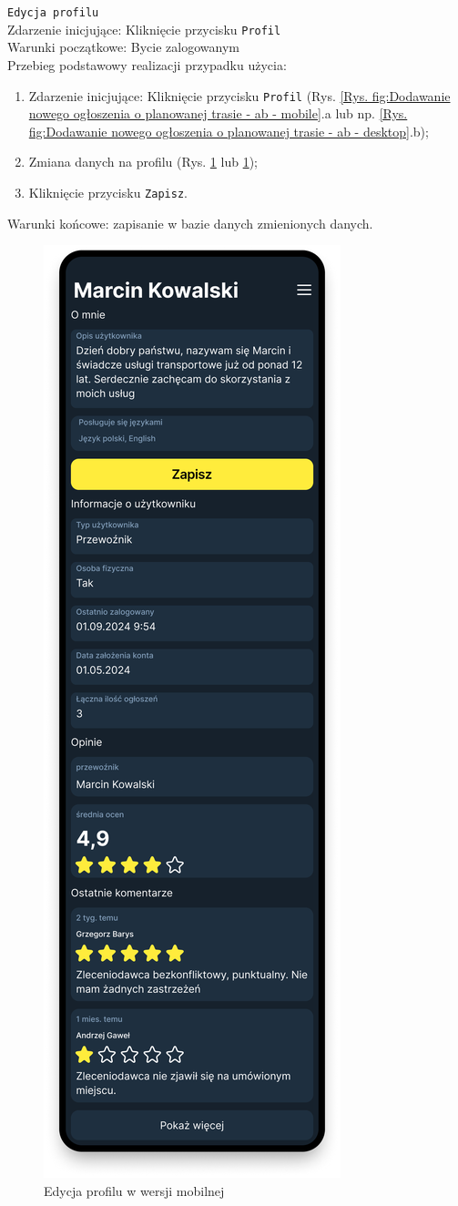 \texttt{Edycja profilu} \\
Zdarzenie inicjujące: Kliknięcie przycisku \texttt{Profil} \\
Warunki początkowe: Bycie zalogowanym \\
Przebieg podstawowy realizacji przypadku użycia: \\
\begin{enumerate}
    \item Zdarzenie inicjujące: Kliknięcie przycisku \texttt{Profil} (Rys. \ref{Rys. fig:Dodawanie nowego ogłoszenia o planowanej trasie - ab - mobile}.a lub np. \ref{Rys. fig:Dodawanie nowego ogłoszenia o planowanej trasie - ab - desktop}.b);
    \item Zmiana danych na profilu (Rys. \ref{Edytuj profil - mobile} lub \ref{Edytuj profil - mobile});
    \item Kliknięcie przycisku \texttt{Zapisz}.
\end{enumerate}
Warunki końcowe: zapisanie w bazie danych zmienionych danych. \\
\begin{figure}[H]
	\centering
		\includegraphics[width=0.3\linewidth]{rozdzial1/edytuj_profil_m.png}
	\caption{Edycja profilu w wersji mobilnej}
	\label{Edytuj profil - mobile}
\end{figure}
